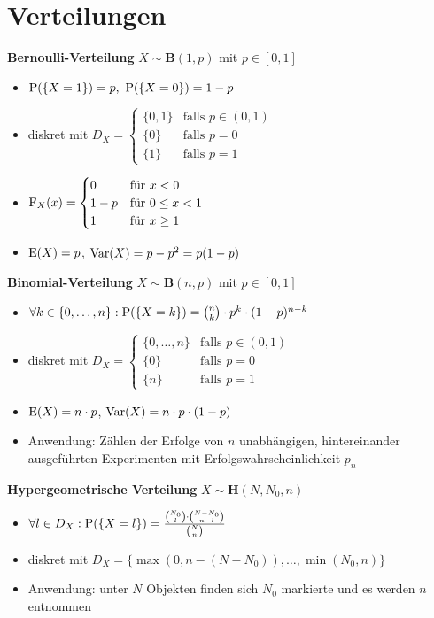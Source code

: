 \section{Verteilungen}

\textbf{Bernoulli-Verteilung} $X\sim\mathbf{B}(1,p)$ mit $p\in [0,1]$
\begin{itemize}
\item $\P(\{X=1\})=p,\ \P(\{X=0\})=1-p$

\item diskret mit $D_X=\begin{cases}
\{0,1\} 	& \text{falls } p\in (0,1)	\\
\{0\}	& \text{falls } p=0			\\
\{1\} 	& \text{falls } p=1
\end{cases}$

\item $\F_X(x)=\begin{cases}
0 	& \text{für } x<0				\\
1-p	& \text{für } 0\leq x <1			\\
1 	& \text{für } x\geq 1
\end{cases}$

\item $\E(X)=p$, $\Var(X)=p-p^2=p(1-p)$

\end{itemize}

\textbf{Binomial-Verteilung} $X\sim\mathbf{B}(n,p)$ mit $p\in [0,1]$
\begin{itemize}
\item $\forall k\in\{0,\ldots,n\}:\P(\{X=k\})=\binom{n}{k}\cdot p^k\cdot (1-p)^{n-k}$

\item diskret mit
$D_X=\begin{cases}
\{0,\ldots,n\} 	& \text{falls } p\in (0,1)	\\
\{0\}			& \text{falls } p=0			\\
\{n\} 			& \text{falls } p=1
\end{cases}$

\item $\E(X)=n\cdot p$, $\Var(X)=n\cdot p\cdot (1-p)$

\item Anwendung: Zählen der Erfolge von $n$ unabhängigen, hintereinander ausgeführten
Experimenten mit Erfolgswahrscheinlichkeit $p_n$
\end{itemize}

\textbf{Hypergeometrische Verteilung} $X\sim\mathbf{H}(N,N_0,n)$
\begin{itemize}
\item $\forall l\in D_X:\P(\{X=l\})
=\frac{\binom{N_0}{l}\cdot\binom{N-N_0}{n-l}}{\binom{N}{n}}$

\item diskret mit 
$D_X=\{\operatorname{max}(0,n-(N-N_0)),\ldots,\operatorname{min}(N_0,n)\}$

\item Anwendung: unter $N$ Objekten finden sich $N_0$ markierte und es werden
$n$ entnommen
\end{itemize}

